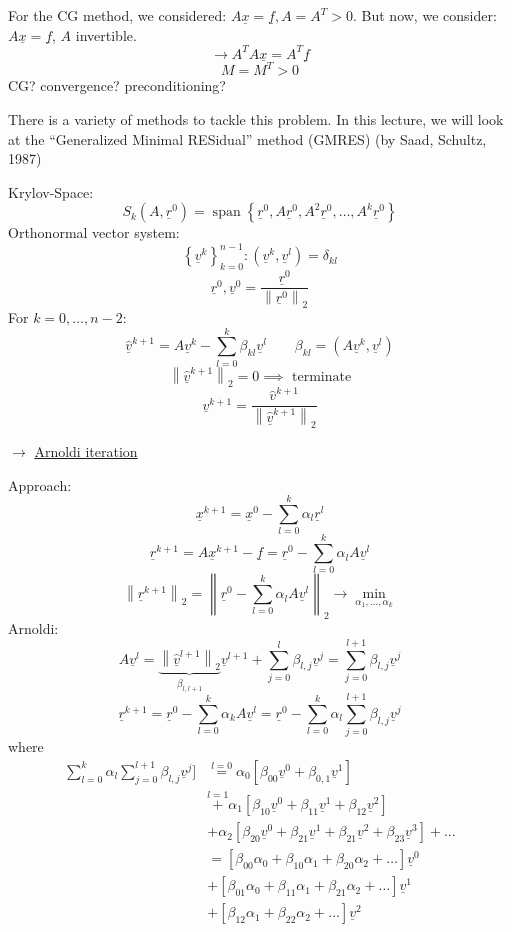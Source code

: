 \documentclass{article}
\newcommand{\norm}[1]{\left\|#1\right\|}
\begin{document}
For the CG method, we considered: $A \underline x = \underline f, A = A^T > 0$.
But now, we consider: $A \underline x = \underline f$, $A$ invertible.
\[ \rightarrow A^T A \underline x = A^T \underline f \]
\[ M = M^T > 0 \]
CG? convergence? preconditioning?

There is a variety of methods to tackle this problem.
In this lecture, we will look at the \enquote{Generalized Minimal RESidual} method (GMRES) (by Saad, Schultz, 1987)

Krylov-Space:
\[ S_k(A, \underline r^0) = \operatorname{span}\left\{\underline r^0, A \underline r^0, A^2 \underline r^0, \ldots, A^k \underline r^0\right\} \]
Orthonormal vector system:
\[ \left\{\underline v^k\right\}_{k=0}^{n-1}: (\underline v^k, \underline v^l) = \delta_{kl} \]
\[ \underline r^0, \underline v^0 = \frac{\underline r^0}{\norm{\underline r^0}_2} \]
For $k=0, \ldots, n-2$:
\[ \hat{\underline v}^{k+1} = A \underline v^k - \sum_{l=0}^{k} \beta_{kl} \underline v^l \qquad \beta_{kl} = (A \underline v^k, \underline v^l) \]
\[ \norm{\hat{\underline v}^{k+1}}_2 = 0 \implies \text{ terminate} \]
\[ \underline v^{k+1} = \frac{\hat v^{k+1}}{\norm{\underline{\hat v}^{k+1}}_2} \]

$\rightarrow$ \href{https://en.wikipedia.org/wiki/Arnoldi_iteration}{Arnoldi iteration}

Approach:
\[ \underline x^{k+1} = \underline x^0 - \sum_{l=0}^k \alpha_l \underline{r}^l \]
\[ \underline{r}^{k+1} = A \underline x^{k+1} - \underline f = \underline r^0 - \sum_{l=0}^k \alpha_l A \underline v^l \]
\[ \norm{\underline r^{k+1}}_2 = \norm{\underline r^0 - \sum_{l=0}^k \alpha_l A{\underline v}^l}_2 \to \min_{\alpha_1, \ldots, \alpha_k} \]
Arnoldi:
\[ A \underline v^l = \underbrace{\norm{\underline{\hat v}^{l+1}}_2}_{\beta_{l,l+1}} \underline{v}^{l+1} + \sum_{j=0}^l \beta_{l,j} \underline v^j = \sum_{j=0}^{l+1} \beta_{l,j} \underline v^j \]
\[ \underline{r}^{k+1} = \underline r^0 - \sum_{l=0}^k \alpha_k A \underline v^l = \underline r^0 - \sum_{l=0}^k \alpha_l \sum_{j=0}^{l+1} \beta_{l,j} \underline v^j \]
where
\begin{align*}
  \sum_{l=0}^k \alpha_l \sum_{j=0}^{l+1} \beta_{l,j} \underline v^j]
    &\stackrel{l=0}{=} \alpha_0 \left[\beta_{00} \underline v^0 + \beta_{0,1} \underline v^1\right] \\
    &\stackrel{l=1}{+} \alpha_1 \left[\beta_{10} \underline v^0 + \beta_{11} \underline v^1 + \beta_{12} \underline v^2 \right] \\
    &+ \alpha_2 \left[ \beta_{20} \underline v^0 + \beta_{21} \underline v^1 + \beta_21 \underline v^2 + \beta_{23} \underline v^3\right] + \ldots \\
    &= \left[ \beta_{00} \alpha_0 + \beta_{10} \alpha_1 + \beta_{20} \alpha_{2} + \ldots \right] \underline{v}^0 \\
    &+ \left[ \beta_{01} \alpha_0 + \beta_{11} \alpha_1 + \beta_{21} \alpha_2 + \ldots \right] \underline{v}^1 \\
    &+ \left[ \beta_{12} \alpha_1 + \beta_{22} \alpha_2 + \ldots \right] \underline v^2
\end{align*}
\end{document}
